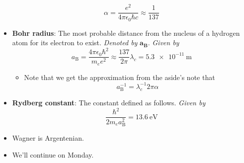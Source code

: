 \documentclass[../notes.tex]{subfiles}
\begin{document}
\begin{itemize}
    \begin{equation*}
        \alpha = \frac{e^2}{4\pi\epsilon_0\hbar c} \approx \frac{1}{137}
    \end{equation*}
    \item \textbf{Bohr radius}: The most probable distance from the nucleus of a hydrogen atom for its electron to exist. \emph{Denoted by} $\bm{a_\textbf{B}}$. \emph{Given by}
    \begin{equation*}
        a_\text{B} = \frac{4\pi\epsilon_0\hbar^2}{m_ee^2}
        \approx \frac{137}{2\pi}\lambda_c
        = \SI{5.3e-11}{\meter}
    \end{equation*}
    \begin{itemize}
        \item Note that we get the approximation from the aside's note that
        \begin{equation*}
            a_\text{B}^{-1} = \lambda_c^{-1}2\pi\alpha
        \end{equation*}
    \end{itemize}
    \item \textbf{Rydberg constant}: The constant defined as follows. \emph{Given by}
    \begin{equation*}
        \frac{\hbar^2}{2m_ea_\text{B}^2} = \SI{13.6}{\electronvolt}
    \end{equation*}
    \item Wagner is Argentenian.
    \item We'll continue on Monday.
\end{itemize}
\end{document}
